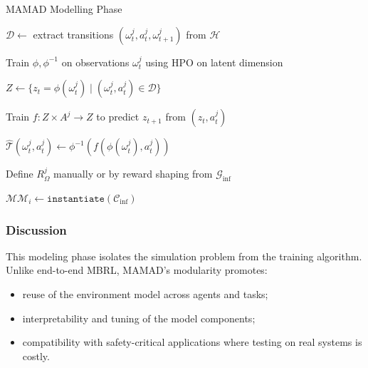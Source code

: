 \documentclass[pdflatex,sn-mathphys-num]{sn-jnl}%
\theoremstyle{thmstyleone}%
\theoremstyle{thmstyletwo}%
\theoremstyle{thmstylethree}%
\begin{document}
\begin{algorithm}[H]
    \caption{MAMAD Modelling Phase}
    \label{alg:modelling}
    \DontPrintSemicolon
    
    $\mathcal{D} \gets$ extract transitions $(\omega^j_t, a^j_t, \omega^j_{t+1})$ from $\mathcal{H}$

    Train $\phi, \phi^{-1}$ on observations $\omega^j_t$ using HPO on latent dimension

    $Z \gets \{ z_t = \phi(\omega^j_t) \mid (\omega^j_t, a^j_t) \in \mathcal{D} \}$

    Train $f: Z \times A^j \rightarrow Z$ to predict $z_{t+1}$ from $(z_t, a^j_t)$

    $\hat{\mathcal{T}}(\omega^j_t, a^j_t) \gets \phi^{-1}(f(\phi(\omega^j_t), a^j_t))$

    Define $R^j_\Omega$ manually or by reward shaping from $\mathcal{G}_{\text{inf}}$

    $\mathcal{MM}_i \gets \texttt{instantiate}(\mathcal{C}_{\text{inf}})$
\end{algorithm}

\subsubsection*{Discussion}

This modeling phase isolates the simulation problem from the training algorithm. Unlike end-to-end MBRL, MAMAD's modularity promotes:
\begin{itemize}
    \item reuse of the environment model across agents and tasks;
    \item interpretability and tuning of the model components;
    \item compatibility with safety-critical applications where testing on real systems is costly.
\end{itemize}
\end{document}
